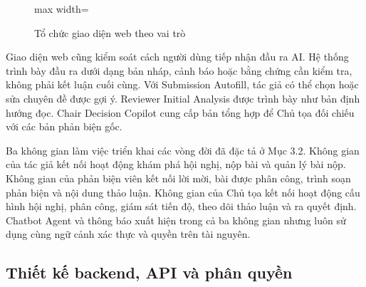 \begin{figure}[H]
  \centering
  \begin{adjustbox}{max width=\textwidth}
  \end{adjustbox}
  \caption{Tổ chức giao diện web theo vai trò}
  \label{fig:ch3-15}
\end{figure}

Giao diện web cũng kiểm soát cách người dùng tiếp nhận đầu ra AI. Hệ thống trình bày đầu ra dưới dạng bản nháp, cảnh báo hoặc bằng chứng cần kiểm tra, không phải kết luận cuối cùng. Với Submission Autofill, tác giả có thể chọn hoặc sửa chuyên đề được gợi ý. Reviewer Initial Analysis được trình bày như bản định hướng đọc. Chair Decision Copilot cung cấp bản tổng hợp để Chủ tọa đối chiếu với các bản phản biện gốc.

Ba không gian làm việc triển khai các vòng đời đã đặc tả ở Mục 3.2. Không gian của tác giả kết nối hoạt động khám phá hội nghị, nộp bài và quản lý bài nộp. Không gian của phản biện viên kết nối lời mời, bài được phân công, trình soạn phản biện và nội dung thảo luận. Không gian của Chủ tọa kết nối hoạt động cấu hình hội nghị, phân công, giám sát tiến độ, theo dõi thảo luận và ra quyết định. Chatbot Agent và thông báo xuất hiện trong cả ba không gian nhưng luôn sử dụng cùng ngữ cảnh xác thực và quyền trên tài nguyên.

\subsection{Thiết kế backend, API và phân quyền}

